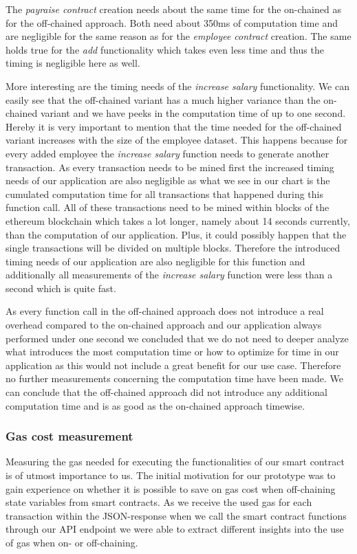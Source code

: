 The \textit{payraise contract} creation needs about the same time for the on-chained as for the off-chained approach. Both need about 350ms of computation time and are negligible for the same reason as for the \textit{employee contract} creation. The same holds true for the \textit{add} functionality which takes even less time and thus the timing is negligible here as well.

More interesting are the timing needs of the \textit{increase salary} functionality. We can easily see that the off-chained variant has a much higher variance than the on-chained variant and we have peeks in the computation time of up to one second. Hereby it is very important to mention that the time needed for the off-chained variant increases with the size of the employee dataset. This happens because for every added employee the \textit{increase salary} function needs to generate another transaction. As every transaction needs to be mined first the increased timing needs of our application are also negligible as what we see in our chart is the cumulated computation time for all transactions that happened during this function call. All of these transactions need to be mined within blocks of the ethereum blockchain which takes a lot longer, namely about 14 seconds currently, than the computation of our application. Plus, it could possibly happen that the single transactions will be divided on multiple blocks. Therefore the introduced timing needs of our application are also negligible for this function and additionally all measurements of the \textit{increase salary} function were less than a second which is quite fast.%

As every function call in the off-chained approach does not introduce a real overhead compared to the on-chained approach and our application always performed under one second we concluded that we do not need to deeper analyze what introduces the most computation time or how to optimize for time in our application as this would not include a great benefit for our use case. Therefore no further measurements concerning the computation time have been made. We can conclude that the off-chained approach did not introduce any additional computation time and is as good as the on-chained approach timewise.

\subsubsection{Gas cost measurement}
Measuring the gas needed for executing the functionalities of our smart contract is of utmost importance to us. The initial motivation for our prototype was to gain experience on whether it is possible to save on gas cost when off-chaining state variables from smart contracts. As we receive the used gas for each transaction within the JSON-response when we call the smart contract functions through our API endpoint we were able to extract different insights into the use of gas when on- or off-chaining.


